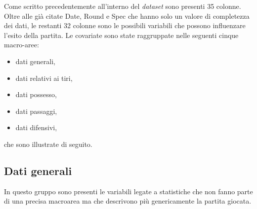 Come scritto precedentemente all'interno del \emph{dataset} sono presenti 35 colonne. Oltre alle già citate \textsf{Date}, \textsf{Round} e \textsf{Spec} che hanno solo un valore di completezza dei dati, le restanti 32 colonne sono le possibili variabili che possono influenzare l'esito della partita.
Le covariate sono state raggruppate nelle seguenti cinque macro-aree:
\begin{itemize}
	\item dati generali,
	\item dati relativi ai tiri,
	\item dati possesso,
	\item dati passaggi,
	\item dati difensivi,
\end{itemize}

che sono illustrate di seguito.

\subsection{Dati generali}
In questo gruppo sono presenti le variabili legate a statistiche che non fanno parte di una precisa macroarea ma che descrivono più genericamente la partita giocata. 


